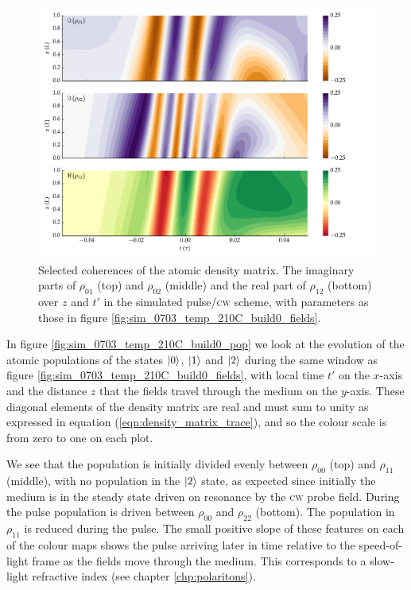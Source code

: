     \begin{figure}[h]
      \includegraphics[width=\linewidth]
        {figs/06_simultons/mb_vee2g_build0_15c_130p_0330t_230C_sb50_120vel000_00_002um_fig4.pdf}
      \caption{
      Selected coherences of the atomic density matrix. The imaginary parts of
      $\rho_{01}$ (top) and $\rho_{02}$ (middle) and the real part of
      $\rho_{12}$ (bottom) over $z$ and $t'$ in the simulated pulse/\textsc{cw}
      scheme, with parameters as those in figure
      \ref{fig:sim_0703_temp_210C_build0_fields}.
      }
      \label{fig:sim_0703_temp_210C_build0_coh}
    \end{figure}

    In figure \ref{fig:sim_0703_temp_210C_build0_pop} we look at the evolution
    of the atomic populations of the states $\Ket{0}$, $\Ket{1}$ and $\Ket{2}$
    during the same window as figure \ref{fig:sim_0703_temp_210C_build0_fields},
    with local time $t'$ on the $x$-axis and the distance $z$ that the fields
    travel through the medium on the $y$-axis. These diagonal elements of the
    density matrix are real and must sum to unity as expressed in equation
    (\ref{eqn:density_matrix_trace}), and so the colour scale is from zero to
    one on each plot.

    We see that the population is initially divided evenly between $\rho_{00}$
    (top) and $\rho_{11}$ (middle), with no population in the $\Ket{2}$ state,
    as expected since initially the medium is in the steady state driven on
    resonance by the \textsc{cw} probe field. During the pulse population is
    driven between $\rho_{00}$ and $\rho_{22}$ (bottom). The population in
    $\rho_{11}$ is reduced during the pulse. The small positive slope of these
    features on each of the colour maps shows the pulse arriving later in time
    relative to the  speed-of-light frame as the fields move through the medium.
    This corresponds to a slow-light refractive index (see chapter
    \ref{chp:polaritons}).


